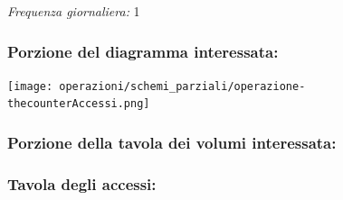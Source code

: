 \documentclass[12pt,a4paper]{article}
\begin{document}
\noindent\textit{Frequenza giornaliera:} 1

\subsubsection*{Porzione del diagramma interessata:}

\texttt{[image: operazioni/schemi\_parziali/operazione-\\thecounterAccessi.png]} 
\subsubsection*{Porzione della tavola dei volumi interessata:}

\subsubsection*{Tavola degli accessi:}
\end{document}
